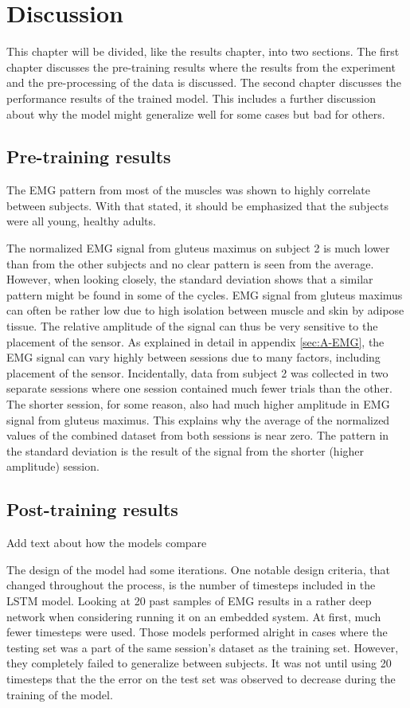 \documentclass[../main.tex]{subfiles}
\begin{document}
\chapter{Discussion}
\label{sec:discussion}
This chapter will be divided, like the results chapter, into two sections. 
The first chapter discusses the pre-training results where the results from the experiment and the pre-processing of the data is discussed.
The second chapter discusses the performance results of the trained model.
This includes a further discussion about why the model might generalize well for some cases but bad for others.

\section{Pre-training results}
\label{sec:discussion_pre-training-results}
The \ac{EMG} pattern from most of the muscles was shown to highly correlate between subjects.
With that stated, it should be emphasized that the subjects were all young, healthy adults.

The normalized \ac{EMG} signal from gluteus maximus on subject 2 is much lower than from the other subjects and no clear pattern is seen from the average.
However, when looking closely, the standard deviation shows that a similar pattern might be found in some of the cycles.
\ac{EMG} signal from gluteus maximus can often be rather low due to high isolation between muscle and skin by adipose tissue.
The relative amplitude of the signal can thus be very sensitive to the placement of the sensor.
As explained in detail in appendix \ref{sec:A-EMG}, the \ac{EMG} signal can vary highly between sessions due to many factors, including placement of the sensor.
Incidentally, data from subject 2 was collected in two separate sessions where one session contained much fewer trials than the other.
The shorter session, for some reason, also had much higher amplitude in \ac{EMG} signal from gluteus maximus.
This explains why the average of the normalized values of the combined dataset from both sessions is near zero.
The pattern in the standard deviation is the result of the signal from the shorter (higher amplitude) session.

\section{Post-training results}
\label{sec:discussion_post-training-results}
Add text about how the models compare

The design of the model had some iterations. 
One notable design criteria, that changed throughout the process, is the number of timesteps included in the \ac{LSTM} model.
Looking at 20 past samples of \ac{EMG} results in a rather deep network when considering running it on an embedded system.
At first, much fewer timesteps were used.
Those models performed alright in cases where the testing set was a part of the same session's dataset as the training set.
However, they completely failed to generalize between subjects.
It was not until using 20 timesteps that the the error on the test set was observed to decrease during the training of the model.
\end{document}
